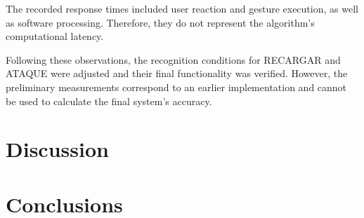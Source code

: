 \documentclass[lettersize,journal]{IEEEtran}
\begin{document}
	The recorded response times included user reaction and gesture execution, as well as software processing. Therefore, they do not represent the algorithm's computational latency.
	
	Following these observations, the recognition conditions for RECARGAR and ATAQUE were adjusted and their final functionality was verified. However, the preliminary measurements correspond to an earlier implementation and cannot be used to calculate the final system's accuracy.
	
	\section{Discussion}
	\label{sec:discussion}
	
	\section{Conclusions}
	\label{sec:conclusions}
	
	
	
	\balance
	
	
	
	
\end{document}
